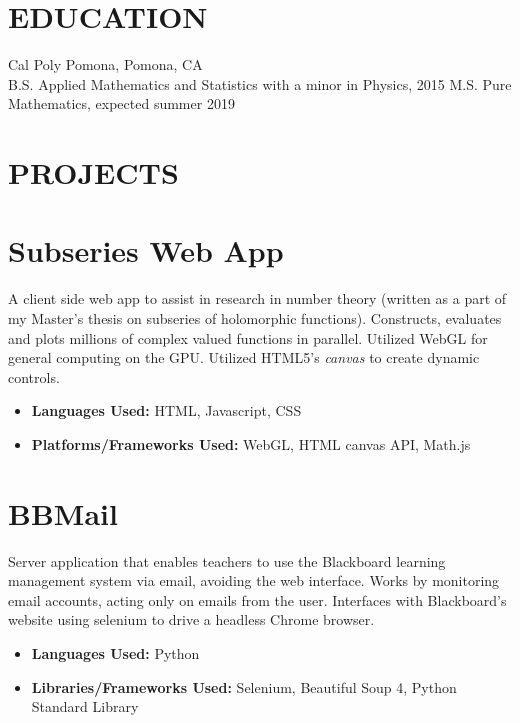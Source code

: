 \documentclass[margin]{res}
\begin{document}
  

\address{ raphaelreyna@protonmail.com \\
  (626) 384-1342 }
                           
                        
\begin{resume}
\section{EDUCATION}
Cal Poly Pomona, Pomona, CA \\
B.S. Applied Mathematics and Statistics with a minor in Physics, 2015 \newline
M.S. Pure Mathematics, expected summer 2019
 
\section{PROJECTS}
  
\normalsize{\section{Subseries Web App}}
A client side web app to assist in
research in number theory (written as a part of my Master's thesis on subseries
of holomorphic functions). Constructs, evaluates and plots millions of complex
valued functions in parallel. Utilized WebGL for general computing on the GPU.
Utilized HTML5's {\it canvas} to create dynamic controls.
\begin{itemize}
\item {\bf Languages Used: } HTML, Javascript, CSS
\item {\bf Platforms/Frameworks Used: } WebGL, HTML canvas API, Math.js
\end{itemize}

\normalsize{\section{BBMail}} Server application that enables teachers to use
the Blackboard learning management system via email, avoiding the web interface.
Works by monitoring email accounts, acting only on emails from the user.
Interfaces with Blackboard's website using selenium to drive a headless Chrome
browser.
\begin{itemize}
\item {\bf Languages Used: } Python
\item {\bf Libraries/Frameworks Used: } Selenium, Beautiful Soup 4, Python
  Standard Library
\end{itemize}


\end{resume}
\end{document}
